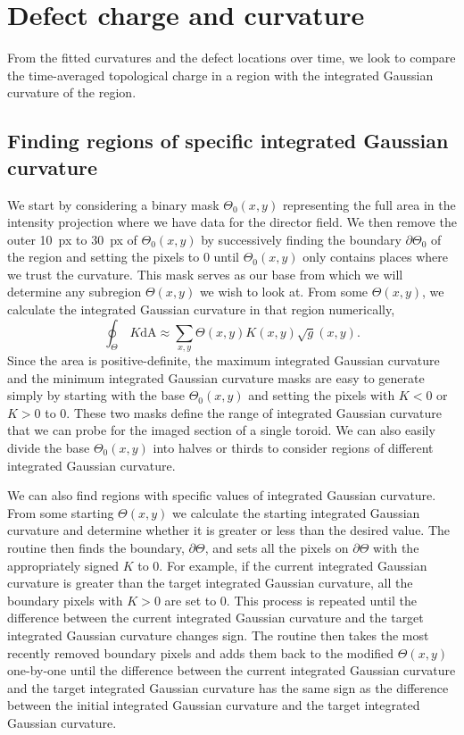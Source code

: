 \section{Defect charge and curvature}
From the fitted curvatures and the defect locations over time, we look to compare the time-averaged topological charge in a region with the integrated Gaussian curvature of the region.


\subsection{Finding regions of specific integrated Gaussian curvature}
We start by considering a binary mask $\Theta_0(x,y)$ representing the full area in the intensity projection where we have data for the director field.
We then remove the outer 10~px to 30~px of $\Theta_0(x,y)$ by successively finding the boundary $\partial \Theta_0$ of the region and setting the pixels to $0$ until $\Theta_0(x,y)$ only contains places where we trust the curvature.
This mask serves as our base from which we will determine any subregion $\Theta(x,y)$ we wish to look at.
From some $\Theta(x,y)$, we calculate the integrated Gaussian curvature in that region numerically,
\begin{equation}
  \oint_{\Theta}\,K\textrm{dA} \approx \sum\limits_{x,y} \Theta(x,y) K(x,y) \sqrt{g}(x,y).
\end{equation}
Since the area is positive-definite, the maximum integrated Gaussian curvature and the minimum integrated Gaussian curvature masks are easy to generate simply by starting with the base $\Theta_0(x,y)$ and setting the pixels with $K < 0$ or $K > 0$ to $0$.
These two masks define the range of integrated Gaussian curvature that we can probe for the imaged section of a single toroid.
We can also easily divide the base $\Theta_0(x,y)$ into halves or thirds to consider regions of different integrated Gaussian curvature.

We can also find regions with specific values of integrated Gaussian curvature.
From some starting $\Theta(x,y)$ we calculate the starting integrated Gaussian curvature and determine whether it is greater or less than the desired value.
The routine then finds the boundary, $\partial \Theta$, and sets all the pixels on $\partial \Theta$ with the appropriately signed $K$ to $0$.
For example, if the current integrated Gaussian curvature is greater than the target integrated Gaussian curvature, all the boundary pixels with $K > 0$ are set to $0$.
This process is repeated until the difference between the current integrated Gaussian curvature and the target integrated Gaussian curvature changes sign.
The routine then takes the most recently removed boundary pixels and adds them back to the modified $\Theta(x,y)$ one-by-one until the difference between the current integrated Gaussian curvature and the target integrated Gaussian curvature has the same sign as the difference between the initial integrated Gaussian curvature and the target integrated Gaussian curvature.


